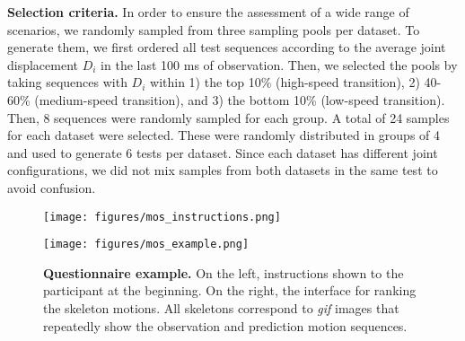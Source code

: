 \documentclass[10pt,twocolumn,letterpaper]{article}
\begin{document}
\textbf{Selection criteria. } In order to ensure the assessment of a wide range of scenarios, we randomly sampled from three sampling pools per dataset. To generate them, we first ordered all test sequences according to the average joint displacement $D_i$ in the last 100 ms of observation. Then, we selected the pools by taking sequences with $D_i$ within 1) the top 10\% (high-speed transition), 2) 40-60\% (medium-speed transition), and 3) the bottom 10\% (low-speed transition). Then, 8 sequences were randomly sampled for each group. A total of 24 samples for each dataset were selected. These were randomly distributed in groups of 4 and used to generate 6 tests per dataset. Since each dataset has different joint configurations, we did not mix samples from both datasets in the same test to avoid confusion.


\begin{figure*}
    \centering
    \begin{minipage}{.48\textwidth}
        \centering
        \texttt{[image: figures/mos\_instructions.png]}
        \label{fig:supp_mos_example}
    \end{minipage}\hfill
    \begin{minipage}{0.48\textwidth}
        \centering
        \texttt{[image: figures/mos\_example.png]}
        \label{fig:supp_mos_instructions}
    \end{minipage}
    \caption{\textbf{Questionnaire example. }On the left, instructions shown to the participant at the beginning. On the right, the interface for ranking the skeleton motions. All skeletons correspond to \textit{gif} images that repeatedly show the observation and prediction motion sequences. }
    \label{fig:supp_mos}
\end{figure*}
\end{document}
